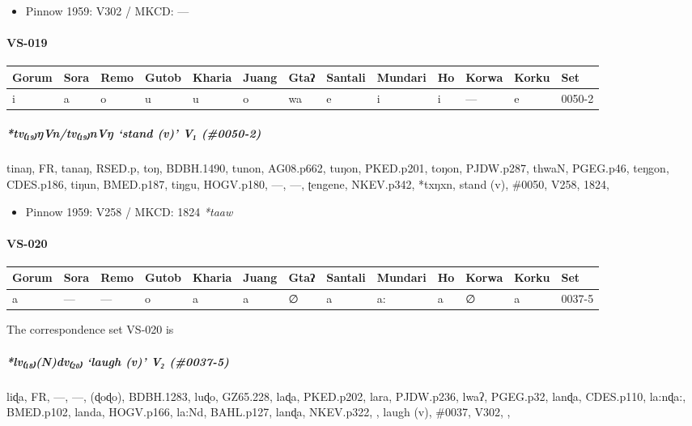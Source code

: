 \documentclass[a4paper,]{article}
\providecommand{\tightlist}{%
  \setlength{\itemsep}{0pt}\setlength{\parskip}{0pt}}
\let\oldparagraph\paragraph
\renewcommand{\paragraph}[1]{\oldparagraph{#1}\mbox{}}
\let\oldsubparagraph\subparagraph
\renewcommand{\subparagraph}[1]{\oldsubparagraph{#1}\mbox{}}
\begin{document}
\begin{itemize}
\tightlist
\item
  Pinnow 1959: V302 / MKCD: ---
\end{itemize}

\paragraph{VS-019}\label{vs-019}

\begin{longtable}[]{@{}lllllllllllll@{}}
\toprule
Gorum & Sora & Remo & Gutob & Kharia & Juang & Gtaʔ & Santali & Mundari
& Ho & Korwa & Korku & Set\tabularnewline
\midrule
\endhead
i & a & o & u & u & o & wa & e & i & i & --- & e & 0050-2\tabularnewline
\bottomrule
\end{longtable}

\subparagraph{\texorpdfstring{\emph{*tv₍₁₉₎ŋVn/tv₍₁₉₎nVŋ} `stand (v)' V₁
(\#0050-2)}{*tv₍₁₉₎ŋVn/tv₍₁₉₎nVŋ stand (v) V₁ (\#0050-2)}}\label{tvux14bvntvnvux14b-stand-v-v-0050-2}

tinaŋ, FR, tanaŋ, RSED.p, toŋ, BDBH.1490, tunon, AG08.p662, tuŋon,
PKED.p201, toŋon, PJDW.p287, thwaN, PGEG.p46, teŋgon, CDES.p186, tiŋun,
BMED.p187, tiŋgu, HOGV.p180, ---, ---, ʈengene, NKEV.p342, *txŋxn, stand
(v), \#0050, V258, 1824,

\begin{itemize}
\tightlist
\item
  Pinnow 1959: V258 / MKCD: 1824 \emph{*taaw}
\end{itemize}

\paragraph{VS-020}\label{vs-020}

\begin{longtable}[]{@{}lllllllllllll@{}}
\toprule
Gorum & Sora & Remo & Gutob & Kharia & Juang & Gtaʔ & Santali & Mundari
& Ho & Korwa & Korku & Set\tabularnewline
\midrule
\endhead
a & --- & --- & o & a & a & ∅ & a & a: & a & ∅ & a &
0037-5\tabularnewline
\bottomrule
\end{longtable}

The correspondence set VS-020 is

\subparagraph{\texorpdfstring{\emph{*lv₍₁₈₎(N)dv₍₂₀₎} `laugh (v)' V₂
(\#0037-5)}{*lv₍₁₈₎(N)dv₍₂₀₎ laugh (v) V₂ (\#0037-5)}}\label{lvndv-laugh-v-v-0037-5}

liɖa, FR, ---, ---, (ɖoɖo), BDBH.1283, luɖo, GZ65.228, laɖa, PKED.p202,
lara, PJDW.p236, lwaʔ, PGEG.p32, lanɖa, CDES.p110, la:nɖa:, BMED.p102,
landa, HOGV.p166, la:Nd, BAHL.p127, lanɖa, NKEV.p322, , laugh (v),
\#0037, V302, ,
\end{document}
